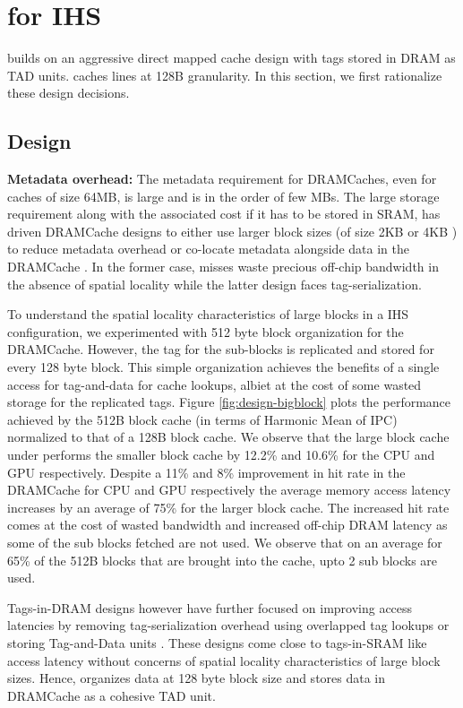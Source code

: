 \section{\cachename for IHS} \label{design+mechanism}

\cachename builds on an aggressive direct mapped cache design with tags stored in DRAM as TAD units. \cachename caches lines at 128B granularity. In this section, we first rationalize these design decisions.

\subsection{\cachename Design} \label{design}

\par \textbf{Metadata overhead:} The metadata requirement for DRAMCaches, even for caches of size 64MB, is large and is in the order of few MBs. The large storage requirement along with the associated cost if it has to be stored in SRAM, has driven DRAMCache designs to either use larger block sizes (of size 2KB or 4KB \cite{footprint,unison-cache}) to reduce metadata overhead or co-locate metadata alongside data in the DRAMCache \cite{loh-hill,alloy,atcache}. In the former case, misses waste precious off-chip bandwidth in the absence of spatial locality while the latter design faces tag-serialization. 
\par To understand the spatial locality characteristics of large blocks in a IHS configuration, we experimented with 512 byte block organization for the DRAMCache. However, the tag for the sub-blocks is replicated and stored for every 128 byte block. This simple organization achieves the benefits of a single access for tag-and-data \cite{alloy} for cache lookups, albiet at the cost of some wasted storage for the replicated tags. Figure \ref{fig:design-bigblock} plots the performance achieved by the 512B block cache (in terms of Harmonic Mean of IPC) normalized to that of a 128B block cache. We observe that the large block cache under performs the smaller block cache by 12.2\% and 10.6\% for the CPU and GPU respectively. Despite a 11\% and 8\% improvement in hit rate in the DRAMCache for CPU and GPU respectively the average memory access latency increases by an average of 75\% for the larger block cache. The increased hit rate comes at the cost of wasted bandwidth and increased off-chip DRAM latency as some of the sub blocks fetched are not used. We observe that on an average for 65\% of the 512B blocks that are brought into the cache, upto 2 sub blocks are used. 
\par Tags-in-DRAM designs however have further focused on improving access latencies by removing tag-serialization overhead using overlapped tag lookups \cite{loh-hill} or storing Tag-and-Data units \cite{alloy} . These designs come close to tags-in-SRAM like access latency without concerns of spatial locality characteristics of large block sizes. 
Hence, \cachename organizes data at 128 byte block size and stores data in DRAMCache as a cohesive TAD unit.

